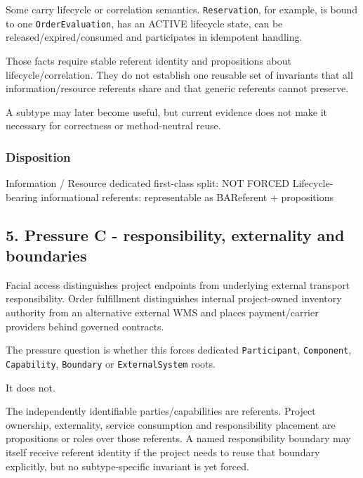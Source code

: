 \documentclass[
  10pt,
]{article}
\newenvironment{Shaded}{}{}
\newcommand{\NormalTok}[1]{#1}
\begin{document}
Some carry lifecycle or correlation semantics. \texttt{Reservation}, for
example, is bound to one \texttt{OrderEvaluation}, has an ACTIVE
lifecycle state, can be released/expired/consumed and participates in
idempotent handling.

Those facts require stable referent identity and propositions about
lifecycle/correlation. They do not establish one reusable set of
invariants that all information/resource referents share and that
generic referents cannot preserve.

A subtype may later become useful, but current evidence does not make it
necessary for correctness or method-neutral reuse.

\subsubsection{Disposition}\label{disposition-1}

\begin{Shaded}
\begin{Highlighting}[]
\NormalTok{Information / Resource dedicated first{-}class split: NOT FORCED}
\NormalTok{Lifecycle{-}bearing informational referents: representable as BAReferent + propositions}
\end{Highlighting}
\end{Shaded}

\subsection{5. Pressure C - responsibility, externality and
boundaries}\label{pressure-c---responsibility-externality-and-boundaries}

Facial access distinguishes project endpoints from underlying external
transport responsibility. Order fulfillment distinguishes internal
project-owned inventory authority from an alternative external WMS and
places payment/carrier providers behind governed contracts.

The pressure question is whether this forces dedicated
\texttt{Participant}, \texttt{Component}, \texttt{Capability},
\texttt{Boundary} or \texttt{ExternalSystem} roots.

It does not.

The independently identifiable parties/capabilities are referents.
Project ownership, externality, service consumption and responsibility
placement are propositions or roles over those referents. A named
responsibility boundary may itself receive referent identity if the
project needs to reuse that boundary explicitly, but no subtype-specific
invariant is yet forced.
\end{document}
